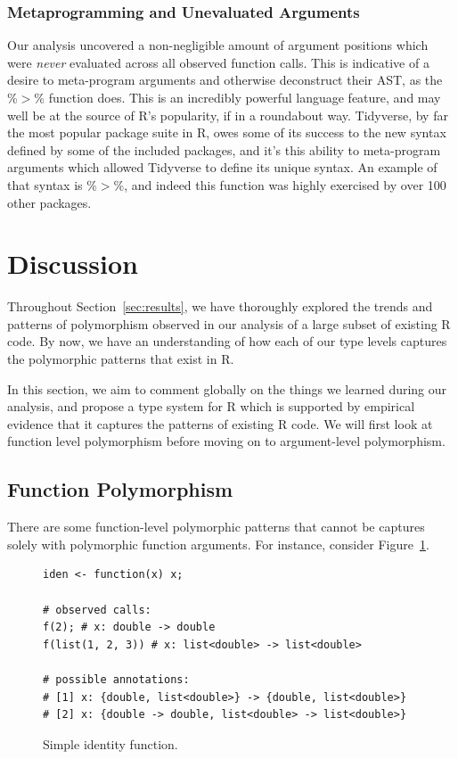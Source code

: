 \documentclass[acmsmall,10pt,review,anonymous]{acmart}\settopmatter{printfolios=true,printccs=false,printacmref=false}
\begin{document}
%
%
%
%
\subsubsection{Metaprogramming and Unevaluated Arguments}

Our analysis uncovered a non-negligible amount of argument positions which were {\it never} evaluated across all observed function calls.
This is indicative of a desire to meta-program arguments and otherwise deconstruct their AST, as the \%$>$\% function does.
This is an incredibly powerful language feature, and may well be at the source of R's popularity, if in a roundabout way.
Tidyverse, by far the most popular package suite in R, owes some of its success to the new syntax defined by some of the included packages, and it's this ability to meta-program arguments which allowed Tidyverse to define its unique syntax.
An example of that syntax is \%$>$\%, and indeed this function was highly exercised by over 100 other packages.

%
%  
%
%
%
%
\section{Discussion}

Throughout Section~\ref{sec:results}, we have thoroughly explored the trends and patterns of polymorphism observed in our analysis of a large subset of existing R code.
By now, we have an understanding of how each of our type levels captures the polymorphic patterns that exist in R.

In this section, we aim to comment globally on the things we learned during our analysis, and propose a type system for R which is supported by empirical evidence that it captures the patterns of existing R code.
We will first look at function level polymorphism before moving on to argument-level polymorphism.

%
%
%
%
\subsection{Function Polymorphism}

There are some function-level polymorphic patterns that cannot be captures solely with polymorphic function arguments.
For instance, consider Figure~\ref{fig:funanno}.

\begin{figure}[!hb]{\small\begin{lstlisting}[style=R]
iden <- function(x) x;

# observed calls:
f(2); # x: double -> double
f(list(1, 2, 3)) # x: list<double> -> list<double>

# possible annotations:
# [1] x: {double, list<double>} -> {double, list<double>}
# [2] x: {double -> double, list<double> -> list<double>}
\end{lstlisting}}\caption{Simple identity function.}\label{fig:funanno}\end{figure}
\end{document}
